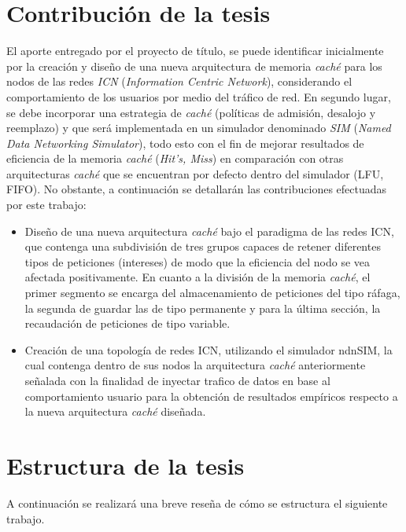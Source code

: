 \documentclass[12pt]{ociamthesis}  %
\begin{document}
\section{Contribución de la tesis}
El aporte entregado por el proyecto de título, se puede identificar inicialmente por la creación y diseño de una nueva arquitectura de memoria \textit{caché} para los nodos de las redes \textit{ICN} (\textit{Information Centric Network}), considerando el comportamiento de los usuarios por medio del tráfico de red. En segundo lugar, se debe incorporar una estrategia de \textit{caché} (políticas de admisión, desalojo y reemplazo) y que será implementada en un simulador denominado \textit{SIM} (\textit{Named Data Networking Simulator}), todo esto con el fin de mejorar resultados de eficiencia de la memoria \textit{caché} (\textit{Hit's, Miss}) en comparación con otras arquitecturas \textit{caché} que se encuentran por defecto dentro del simulador (LFU, FIFO). No obstante, a continuación se detallarán las contribuciones efectuadas por este trabajo:\\
\begin{itemize}
	\item Diseño de una nueva arquitectura \textit{caché} bajo el paradigma de las redes ICN, que contenga una subdivisión de tres grupos capaces de retener diferentes tipos de peticiones (intereses) de modo que la eficiencia del nodo se vea afectada positivamente. En cuanto a la división de la memoria \textit{caché}, el primer segmento se encarga del almacenamiento de peticiones del tipo ráfaga, la segunda de guardar las de tipo permanente y para la última sección, la recaudación de peticiones de tipo variable.\\
	\item Creación de una topología de redes ICN, utilizando el simulador ndnSIM, la cual contenga dentro de sus nodos la arquitectura \textit{caché} anteriormente señalada con la finalidad de inyectar trafico de datos en base al comportamiento usuario para la obtención de resultados empíricos respecto a la nueva arquitectura \textit{caché} diseñada.\\
\end{itemize}


\section{Estructura de la tesis}
A continuación se realizará una breve reseña de cómo se estructura el siguiente trabajo.\\
\end{document}
